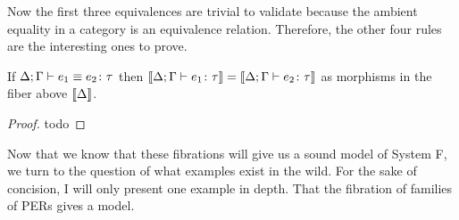 Now the first three equivalences are trivial to validate because the
ambient equality in a category is an equivalence relation. Therefore,
the other four rules are the interesting ones to prove.
\begin{thm}\label{thm:systemf:soundness}
  If $\Delta; \Gamma \vdash e_1 \equiv e_2 \colon \tau$ then
  $\llbracket \Delta; \Gamma \vdash e_1 \colon \tau \rrbracket = \llbracket \Delta; \Gamma \vdash e_2 \colon \tau \rrbracket$
  as morphisms in the fiber above $\llbracket \Delta \rrbracket$.
\end{thm}
\begin{proof}
  todo
\end{proof}

Now that we know that these fibrations will give us a sound model of
System F, we turn to the question of what examples exist in the
wild. For the sake of concision, I will only present one example in
depth. That the fibration of families of PERs gives a model.
